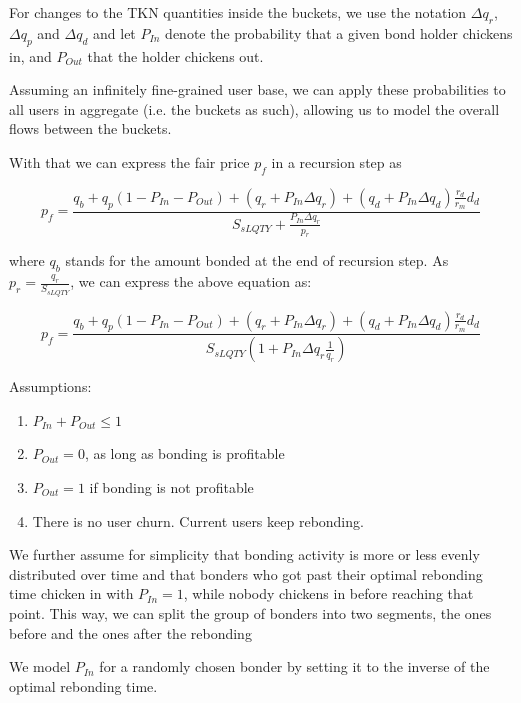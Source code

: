 \documentclass{article}
\begin{document}
For changes to the TKN quantities inside the buckets, we use the notation $\Delta q_{r}$, $\Delta q_{p}$ and $\Delta q_{d}$ and let $P_{In}$ denote the probability that a given bond holder chickens in, and $P_{Out}$ that the holder chickens out.

Assuming an infinitely fine-grained user base, we can apply these probabilities to all users in aggregate (i.e. the buckets as such), allowing us to model the overall flows between the buckets.

With that we can express the fair price $p_f$ in a recursion step as

\begin{equation}
  \label{}
    p_{f} = \frac{q_{b}+q_{p}(1-P_{In}-P_{Out})+(q_{r}+ P_{In}\Delta q_{r})+(q_{d} + P_{In}\Delta q_{d})\frac{r_{d}}{r_{m}}d_{d}}{S_{sLQTY} + \frac{P_{In}\Delta q_r}{p_r}}
\end{equation}

where $q_{b}$ stands for the amount bonded at the end of recursion step. As $p_r = \frac{q_r}{S_{sLQTY}}$, we can express the above equation as:

\begin{equation}
  \label{eq:recursive_hist}
    p_{f} = \frac{q_{b}+q_{p}(1-P_{In}-P_{Out})+(q_{r}+ P_{In}\Delta q_{r})+(q_{d} + P_{In}\Delta q_{d})\frac{r_{d}}{r_{m}}d_{d}}{S_{sLQTY} \left( 1+P_{In} \Delta q_{r} \frac{1}{q_{r}} \right)}
\end{equation}

Assumptions:

\begin{enumerate}
	\item $P_{In} + P_{Out} \leq 1$
	\item $P_{Out} = 0$, as long as bonding is profitable
	\item $P_{Out} = 1$ if bonding is not profitable
	\item There is no user churn. Current users keep rebonding.
\end{enumerate}

We further assume for simplicity that bonding activity is more or less evenly distributed over time and that bonders who got past their optimal rebonding time chicken in with $P_{In}=1$, while nobody chickens in before reaching that point.
This way, we can split the group of bonders into two segments, the ones before and the ones after the rebonding

We model $P_{In}$ for a randomly chosen bonder by setting it to the inverse of the optimal rebonding time.
\end{document}
